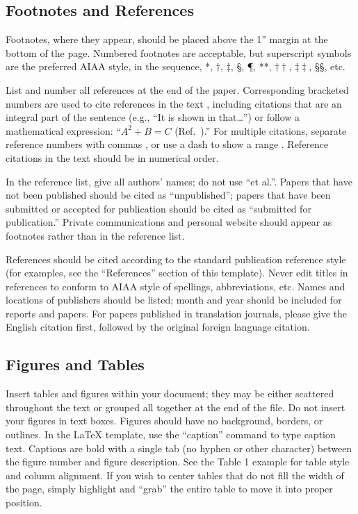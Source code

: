 \documentclass[journal ]{new-aiaa}
\begin{document}
\subsection{Footnotes and References}
Footnotes, where they appear, should be placed above the 1'' margin at the bottom of the page. Numbered footnotes are acceptable, but superscript symbols are the preferred AIAA style, in the sequence, *, $\dag$, $\ddag$, \S, \P, **, $\dag\dag$, $\ddag\ddag$, \S\S, etc.

List and number all references at the end of the paper. Corresponding bracketed numbers are used to cite references in the text \cite{vatistas1986reverse}, including citations that are an integral part of the sentence (e.g., ``It is shown in \cite{dornheim1996planetary} that\ldots '') or follow a mathematical expression: ``$A^{2} + B = C$ (Ref.~\cite{terster1997nasa}).'' For multiple citations, separate reference numbers with commas \cite{peyret2012computational,oates1997aerothermodynamics}, or use a dash to show a range \cite{volpe1994techniques,thompsonspacecraft,chi1993fluid,brandis2016nonequi}. Reference citations in the text should be in numerical order. 

In the reference list, give all authors' names; do not use ``et al.''. Papers that have not been published should be cited as ``unpublished''; papers that have been submitted or accepted for publication should be cited as ``submitted for publication.'' Private communications and personal website should appear as footnotes rather than in the reference list.

References should be cited according to the standard publication reference style (for examples, see the ``References'' section of this template). Never edit titles in references to conform to AIAA style of spellings, abbreviations, etc. Names and locations of publishers should be listed; month and year should be included for reports and papers. For papers published in translation journals, please give the English citation first, followed by the original foreign language citation.

\subsection{Figures and Tables}
Insert tables and figures within your document; they may be either scattered throughout the text or grouped all together at the end of the file. Do not insert your figures in text boxes. Figures should have no background, borders, or outlines. In the \LaTeX{} template, use the ``caption'' command to type caption text. Captions are bold with a single tab (no hyphen or other character) between the figure number and figure description. See the Table 1 example for table style and column alignment. If you wish to center tables that do not fill the width of the page, simply highlight and “grab” the entire table to move it into proper position.
\end{document}
